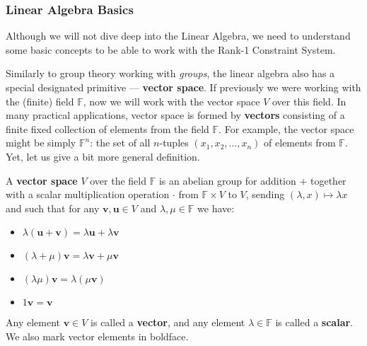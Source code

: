 \documentclass[../lecture-notes.tex]{subfiles}
\begin{document}
\subsubsection{Linear Algebra Basics}

Although we will not dive deep into the Linear Algebra, we need to understand some basic concepts to
be able to work with the Rank-1 Constraint System.

Similarly to group theory working with \textit{groups}, the linear algebra also has a special designated primitive --- \textbf{vector space}. If previously we were working
with the (finite) field $\mathbb{F}$, now we will work with the vector space $V$ over this field. In many practical applications,
vector space is formed by \textbf{vectors} consisting of a finite fixed collection of elements from the field $\mathbb{F}$. For example,
the vector space might be simply $\mathbb{F}^n$: the set of all $n$-tuples $(x_1,x_2,\dots,x_n)$ of elements from $\mathbb{F}$. Yet, let us give a bit more general definition.

\begin{definition}
    A \textbf{vector space} $V$ over the field $\mathbb{F}$ is an abelian group for addition $+$ together with a scalar multiplication operation $\cdot$ from $\mathbb{F} \times V$ to $V$, sending $(\lambda,x) \mapsto \lambda x$ and such that for any $\mathbf{v},\mathbf{u} \in V$ and $\lambda,\mu \in \mathbb{F}$ we have:
    \begin{itemize}
        \item $\lambda(\mathbf{u}+\mathbf{v}) = \lambda \mathbf{u} + \lambda \mathbf{v}$
        \item $(\lambda + \mu)\mathbf{v} = \lambda \mathbf{v} + \mu \mathbf{v}$
        \item $(\lambda \mu)\mathbf{v} = \lambda(\mu \mathbf{v})$
        \item $1\mathbf{v} = \mathbf{v}$
    \end{itemize}

    Any element $\mathbf{v} \in V$ is called a \textbf{vector}, and any element $\lambda \in \mathbb{F}$ is called a \textbf{scalar}. We also mark vector elements in boldface.
\end{definition}
\end{document}
